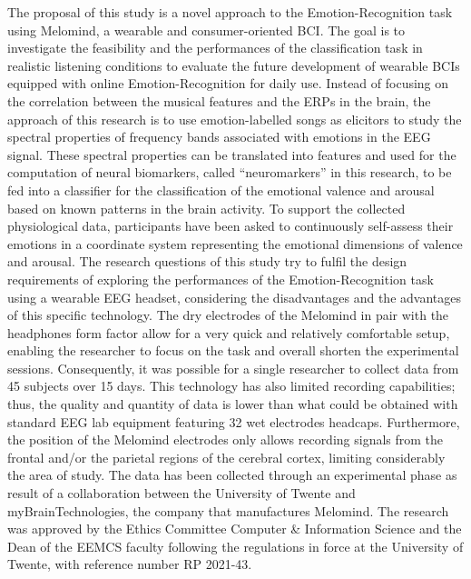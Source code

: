The proposal of this study is a novel approach to the Emotion-Recognition task using Melomind, a wearable and consumer-oriented \ac{BCI}. The goal is to investigate the feasibility and the performances of the classification task in realistic listening conditions to evaluate the future development of wearable \ac{BCIs} equipped with online Emotion-Recognition for daily use. Instead of focusing on the correlation between the musical features and the \ac{ERPs} in the brain, the approach of this research is to use emotion-labelled songs as elicitors to study the spectral properties of frequency bands associated with emotions in the \ac{EEG} signal. These spectral properties can be translated into features and used for the computation of neural biomarkers, called “neuromarkers” in this research, to be fed into a classifier for the classification of the emotional valence and arousal based on known patterns in the brain activity. To support the collected physiological data, participants have been asked to continuously self-assess their emotions in a coordinate system representing the emotional dimensions of valence and arousal. The research questions of this study try to fulfil the design requirements of exploring the performances of the Emotion-Recognition task using a wearable \ac{EEG}  headset, considering the disadvantages and the advantages of this specific technology. The dry electrodes of the Melomind in pair with the headphones form factor allow for a very quick and relatively comfortable setup, enabling the researcher to focus on the task and overall shorten the experimental sessions. Consequently, it was possible for a single researcher to collect data from 45 subjects over 15 days. This technology has also limited recording capabilities; thus, the quality and quantity of data is lower than what could be obtained with standard \ac{EEG} lab equipment featuring 32 wet electrodes headcaps. Furthermore, the position of the Melomind electrodes only allows recording signals from the frontal and/or the parietal regions of the cerebral cortex, limiting considerably the area of study. The data has been collected through an experimental phase as result of a collaboration between the University of Twente and myBrainTechnologies, the company that manufactures Melomind. The research was approved by the Ethics Committee Computer \& Information Science and the Dean of the EEMCS  faculty following the regulations in force at the University of Twente, with reference number RP 2021-43.


